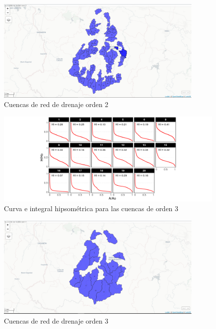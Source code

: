 \documentclass[11pt,]{article}
\begin{document}
\begin{figure}
\centering
\includegraphics[width=0.90000\textwidth]{Mapview_hypsobasinorder2.png}
\caption{Cuencas de red de drenaje orden 2\label{hypb2}}
\end{figure}

\begin{figure}
\centering
\includegraphics[width=1.00000\textwidth]{HypsoBasinOrder3.png}
\caption{Curva e integral hipsométrica para las cuencas de orden
3\label{hysob3}}
\end{figure}

\begin{figure}
\centering
\includegraphics[width=0.90000\textwidth]{Mapview_hypsobasinorder3.png}
\caption{Cuencas de red de drenaje orden 3\label{hypb2}}
\end{figure}
\end{document}
